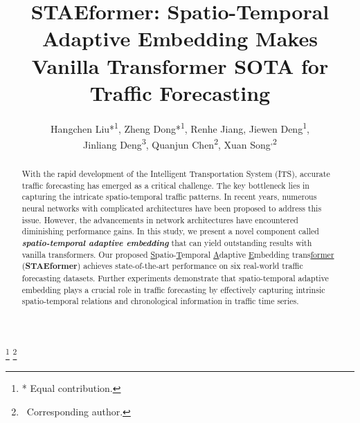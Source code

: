\documentclass[sigconf]{acmart}
\begin{document}
\setlength{\abovedisplayskip}{3pt} \setlength{\belowdisplayskip}{3pt} 

\title{STAEformer: Spatio-Temporal Adaptive Embedding Makes Vanilla Transformer SOTA for Traffic Forecasting}


\author{Hangchen Liu*\textsuperscript{1}, Zheng Dong*\textsuperscript{1}, Renhe Jiang\textsuperscript{}, Jiewen Deng\textsuperscript{1}, \\Jinliang Deng\textsuperscript{3}, Quanjun Chen\textsuperscript{2}, Xuan Song\textsuperscript{,2}}

\thanks{* Equal contribution.}
\thanks{\textdagger~Corresponding author.}






\renewcommand{\shortauthors}{H. Liu, Z. Dong, and R. Jiang et al.}
















\begin{abstract}
With the rapid development of the Intelligent Transportation System (ITS), accurate traffic forecasting has emerged as a critical challenge. The key bottleneck lies in capturing the intricate spatio-temporal traffic patterns. In recent years, numerous neural networks with complicated architectures have been proposed to address this issue. However, the advancements in network architectures have encountered diminishing performance gains. In this study, we present a novel component called \textbf{\textit{spatio-temporal adaptive embedding}} that can yield outstanding results with vanilla transformers. Our proposed \underline{S}patio-\underline{T}emporal \underline{A}daptive \underline{E}mbedding trans\underline{former} (\textbf{STAEformer}) achieves state-of-the-art performance on six real-world traffic forecasting datasets. Further experiments demonstrate that spatio-temporal adaptive embedding plays a crucial role in traffic forecasting by effectively capturing intrinsic spatio-temporal relations and chronological information in traffic time series.

\end{abstract}
\end{document}
